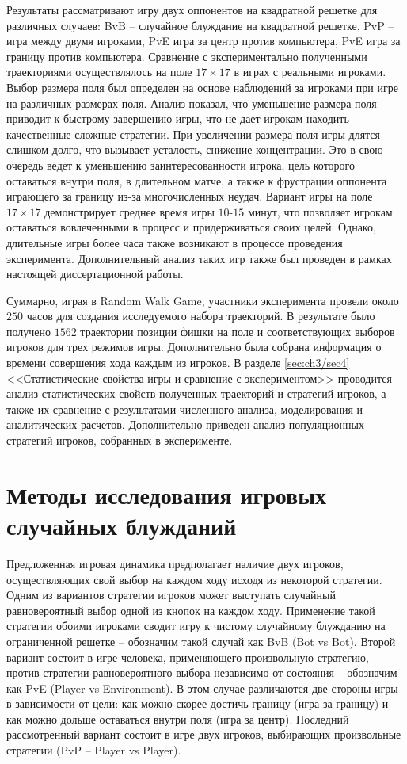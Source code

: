 Результаты рассматривают игру двух оппонентов на квадратной решетке для различных случаев: BvB -- случайное блуждание на квадратной решетке, PvP -- игра между двумя игроками, PvE игра за центр против компьютера, PvE игра за границу против компьютера. Сравнение с экспериментально полученными траекториями осуществлялось на поле $17 \times 17$ в играх с реальными игроками. Выбор размера поля был определен на основе наблюдений за игроками при игре на различных размерах поля. Анализ показал, что уменьшение размера поля приводит к быстрому завершению игры, что не дает игрокам находить качественные сложные стратегии. При увеличении размера поля игры длятся слишком долго, что вызывает усталость, снижение концентрации. Это в свою очередь ведет к уменьшению заинтересованности игрока, цель которого оставаться внутри поля, в длительном матче, а также к фрустрации оппонента играющего за границу из-за многочисленных неудач. Вариант игры на поле $17 \times 17$ демонстрирует среднее время игры $10$-$15$ минут, что позволяет игрокам оставаться вовлеченными в процесс и придерживаться своих целей. Однако, длительные игры более часа также возникают в процессе проведения эксперимента. Дополнительный анализ таких игр также был проведен в рамках настоящей диссертационной работы.

Суммарно, играя в Random Walk Game, участники эксперимента провели около $250$ часов для создания исследуемого набора траекторий. В результате было получено $1562$ траектории позиции фишки на поле и соответствующих выборов игроков для трех режимов игры. Дополнительно была собрана информация о времени совершения хода каждым из игроков. В разделе \cref{sec:ch3/sec4} <<Статистические свойства игры и сравнение с экспериментом>> проводится анализ статистических свойств полученных траекторий и стратегий игроков, а также их сравнение с результатами численного анализа, моделирования и аналитических расчетов. Дополнительно приведен анализ популяционных стратегий игроков, собранных в эксперименте.

\section{Методы исследования игровых случайных блужданий}\label{sec:ch3/sec2}

Предложенная игровая динамика предполагает наличие двух игроков, осуществляющих свой выбор на каждом ходу исходя из некоторой стратегии. Одним из вариантов стратегии игроков может выступать случайный равновероятный выбор одной из кнопок на каждом ходу. Применение такой стратегии обоими игроками сводит игру к чистому случайному блужданию на ограниченной решетке -- обозначим такой случай как BvB (Bot vs Bot). Второй вариант состоит в игре человека, применяющего произвольную стратегию, против стратегии равновероятного выбора независимо от состояния -- обозначим как PvE (Player vs Environment). В этом случае различаются две стороны игры в зависимости от цели: как можно скорее достичь границу (игра за границу) и как можно дольше оставаться внутри поля (игра за центр). Последний рассмотренный вариант состоит в игре двух игроков, выбирающих произвольные стратегии (PvP -- Player vs Player).

